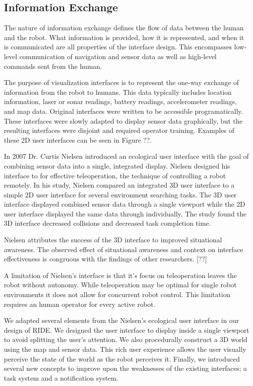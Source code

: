 \subsection{Information Exchange}

The nature of information exchange defines the flow of data between the human and the robot. What information is provided, how it is represented, and when it is communicated are all properties of the interface design. This encompasses low-level communication of navigation and sensor data as well as high-level commands sent from the human. 

The purpose of visualization interfaces is to represent the one-way exchange of information from the robot to humans. This data typically includes location information, laser or sonar readings, battery readings, accelerometer readings, and map data. Original interfaces were written to be accessible programatically. These interfaces were slowly adapted to display sensor data graphically, but the resulting interfaces were disjoint and required operator training. Examples of these 2D user interfaces can be seen in Figure ??.

In 2007 Dr. Curtis Nielsen introduced an ecological user interface with the goal of combining sensor data into a single, integrated display. Nielsen designed his interface to for effective teleoperation, the technique of controlling a robot remotely. In his study, Nielsen compared an integrated 3D user interface to a simple 2D user interface for several environment searching tasks. The 3D user interface displayed combined sensor data through a single viewport while the 2D user interface displayed the same data through individually. The study found the 3D interface decreased collisions and decreased task completion time. \cite{Nielsen_Teleoperation}

Nielsen attributes the success of the 3D interface to improved situational awareness. The observed effect of situational awareness and context on interface effectiveness is congruous with the findings of other researchers. [??]

A limitation of Nielsen's interface is that it's focus on teleoperation leaves the robot without autonomy. While teleoperation may be optimal for single robot environments it does not allow for concurrent robot control. This limitation requires an human operator for every active robot.

We adapted several elements from the Nielsen's ecological user interface in our design of RIDE. We designed the user interface to display inside a single viewport to avoid splitting the user's attention. We also procedurally construct a 3D world using the map and sensor data. This rich user experience allows the user visually perceive the state of the world as the robot perceives it. Finally, we introduced several new concepts to improve upon the weaknesses of the existing interfaces; a task system and a notification system.


